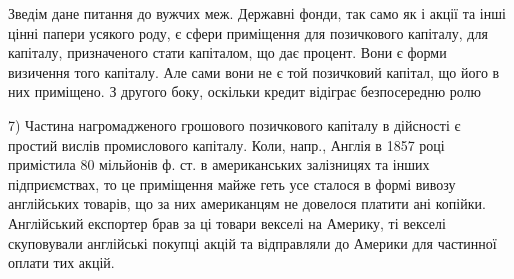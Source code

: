 Зведім дане питання до вужчих меж. Державні фонди, так само як і акції та
інші цінні папери усякого роду, є сфери приміщення для позичкового капіталу,
для капіталу, призначеного стати капіталом, що дає процент. Вони є форми визичення
того капіталу. Але сами вони не є той позичковий капітал, що його
в них приміщено. З другого боку, оскільки кредит відіграє безпосередню ролю

7) Частина нагромадженого грошового позичкового капіталу в дійсності є простий вислів промислового
капіталу. Коли, напр., Англія в 1857 році примістила 80 мільйонів ф. ст. в американських залізницях
та інших підприємствах, то це приміщення майже геть усе сталося в формі вивозу англійських товарів,
що за них американцям не довелося платити ані копійки. Англійський експортер брав за ці товари
векселі на Америку, ті векселі скуповували англійські покупці акцій та відправляли до Америки для
частинної оплати тих акцій.

